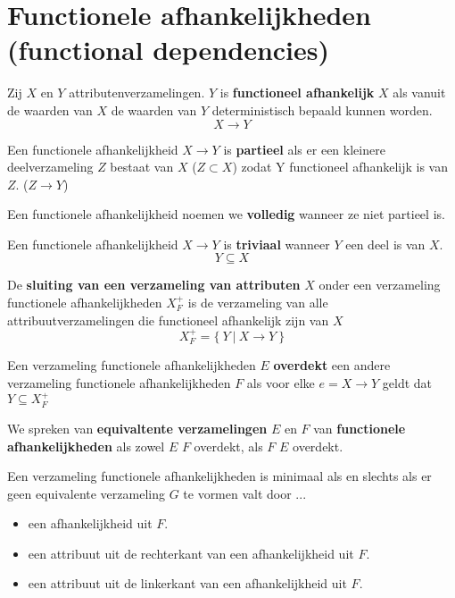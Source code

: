 \documentclass[normaalvormen.tex]{subfiles}
\begin{document}
\section{Functionele afhankelijkheden (functional dependencies)}
\begin{de}
Zij  $X$ en $Y$ attributenverzamelingen. $Y$ is \textbf{functioneel afhankelijk} $X$ als vanuit de waarden van $X$ de waarden van $Y$ deterministisch bepaald kunnen worden.
\[
X\rightarrow Y
\]
\end{de}
\begin{de}
Een functionele afhankelijkheid $X\rightarrow Y$ is \textbf{partieel} als er een kleinere deelverzameling $Z$ bestaat van $X$ ($Z\subset X$) zodat Y functioneel afhankelijk is van $Z$. ($Z\rightarrow Y$)
\end{de}
\begin{de}
Een functionele afhankelijkheid noemen we \textbf{volledig} wanneer ze niet partieel is.
\end{de}
\begin{de}
Een functionele afhankelijkheid $X\rightarrow Y$ is \textbf{triviaal} wanneer $Y$ een deel is van $X$.
\[
Y \subseteq X
\]
\end{de}
\begin{de}
De \textbf{sluiting van een verzameling van attributen} $X$ onder een verzameling functionele afhankelijkheden $X_{F}^+$ is de verzameling van alle attribuutverzamelingen die functioneel afhankelijk zijn van $X$
\[
X_{F}^{+} = \{\ Y\ |\ X\rightarrow Y\ \}
\]
\end{de}
\begin{de}
Een verzameling functionele afhankelijkheden $E$ \textbf{overdekt} een andere verzameling functionele afhankelijkheden $F$ als voor elke $e = X\rightarrow Y$ geldt dat $Y \subseteq X_{F}^{+}$
\end{de}
\begin{de}
We spreken van \textbf{equivaltente verzamelingen} $E$ en $F$ van \textbf{functionele afhankelijkheden} als zowel $E$ $F$ overdekt, als $F$ $E$ overdekt.
\end{de}
\begin{de}
Een verzameling functionele afhankelijkheden is minimaal als en slechts als er geen equivalente verzameling $G$ te vormen valt door  ...
\begin{itemize}
\item een afhankelijkheid uit $F$.
\item een attribuut uit de rechterkant van een afhankelijkheid uit $F$.
\item een attribuut uit de linkerkant van een afhankelijkheid uit $F$.
\end{itemize}
\end{de}
\end{document}
